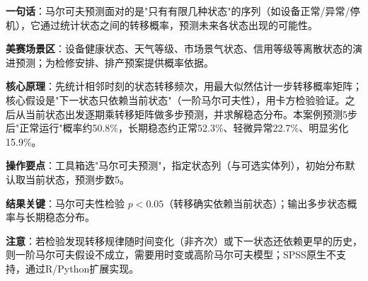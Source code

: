 
\begin{algobrief}
\textbf{一句话}：马尔可夫预测面对的是"只有有限几种状态"的序列（如设备正常/异常/停机），它通过统计状态之间的转移概率，预测未来各状态出现的可能性。

\textbf{美赛场景区}：设备健康状态、天气等级、市场景气状态、信用等级等离散状态的演进预测；为检修安排、排产预案提供概率依据。

\textbf{核心原理}：先统计相邻时刻的状态转移频次，用最大似然估计一步转移概率矩阵；核心假设是"下一状态只依赖当前状态"（一阶马尔可夫性），用卡方检验验证。之后从当前状态出发逐期乘转移矩阵做多步预测，并求解稳态分布。本案例预测5步后"正常运行"概率约50.8\%，长期稳态约正常52.3\%、轻微异常22.7\%、明显劣化15.9\%。

\textbf{操作要点}：工具箱选"马尔可夫预测"，指定状态列（与可选实体列），初始分布默认取当前状态，预测步数5。

\textbf{结果关键}：马尔可夫性检验 $p<0.05$（转移确实依赖当前状态）；输出多步状态概率与长期稳态分布。

\textbf{注意}：若检验发现转移规律随时间变化（非齐次）或下一状态还依赖更早的历史，则一阶马尔可夫假设不成立，需要用时变或高阶马尔可夫模型；SPSS原生不支持，通过R/Python扩展实现。
\end{algobrief}
